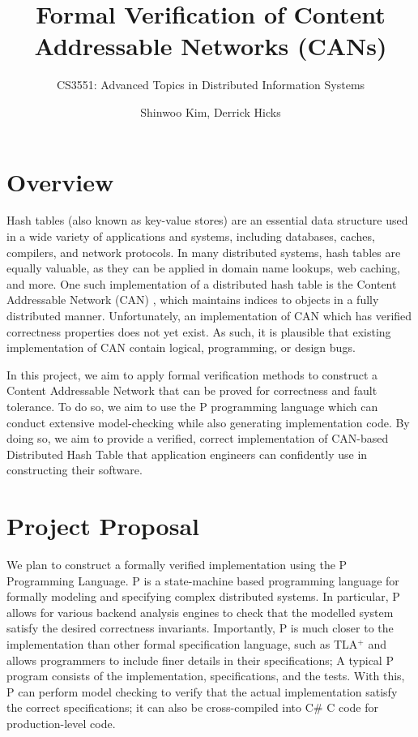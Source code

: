 \documentclass{scrartcl}
\title{
    Formal Verification of Content Addressable Networks (CANs)
}
\subtitle{
    CS3551: Advanced Topics in Distributed Information Systems
}
\author{Shinwoo Kim, Derrick Hicks}
\begin{document}
\maketitle

\section{Overview}
    Hash tables (also known as key-value stores) are an essential data structure used in a wide variety of applications and systems, including databases, caches, compilers, and network protocols. In many distributed systems, hash tables are equally valuable, as they can be applied in domain name lookups, web caching, and more. One such implementation of a distributed hash table is the Content Addressable Network (CAN) \cite{10.1145/964723.383072}, which maintains indices to objects in a fully distributed manner. Unfortunately, an implementation of CAN which has verified correctness properties does not yet exist. As such, it is plausible that existing implementation of CAN contain logical, programming, or design bugs. 
    
    In this project, we aim to apply formal verification methods to construct a Content Addressable Network that can be proved for correctness and fault tolerance. To do so, we aim to use the P programming language \cite{noauthor_p_nodate} which can conduct extensive model-checking while also generating implementation code. By doing so, we aim to provide a verified, correct implementation of CAN-based Distributed Hash Table that application engineers can confidently use in constructing their software.

\section{Project Proposal}

We plan to construct a formally verified implementation using the P Programming Language. P is a state-machine based programming language for formally modeling and specifying complex distributed systems. In particular, P allows for various backend analysis engines to check that the modelled system satisfy the desired correctness invariants. Importantly, P is much closer to the implementation than other formal specification language, such as TLA$^+$ and allows programmers to include finer details in their specifications; A typical P program consists of the implementation, specifications, and the tests. With this, P can perform model checking to verify that the actual implementation satisfy the correct specifications; it can also be cross-compiled into C\# C code for production-level code.
\end{document}
